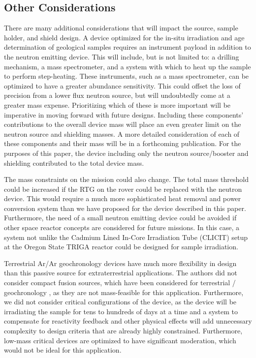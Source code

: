 \documentclass{mc2015}
\begin{document}
\subsection{Other Considerations}
\label{sec:others}

There are many additional considerations that will impact the source, sample holder, and shield design. A device optimized for the in-situ irradiation and age determination of geological samples requires an instrument payload in addition to the neutron emitting device. This will include, but is not limited to: a drilling mechanism, a mass spectrometer, and a system with which to heat up the sample to perform step-heating. These instruments, such as a mass spectrometer, can be optimized to have a greater abundance sensitivity. This could offset the loss of precision from a lower flux neutron source, but will undoubtedly come at a greater mass expense. Prioritizing which of these is more important will be imperative in moving forward with future designs. Including these components' contributions to the overall device mass will place an even greater limit on the neutron source and shielding masses. A more detailed consideration of each of these components and their mass will be in a forthcoming publication. For the purposes of this paper, the device including only the neutron source/booster and shielding contributed to the total device mass. 

The mass constraints on the mission could also change. The total mass threshold could be increased if the RTG on the rover could be replaced with the neutron device. This would require a much more sophisticated heat removal and power conversion system than we have proposed for the device described in this paper. Furthermore, the need of a small neutron emitting device could be avoided if other space reactor concepts are considered for future missions. In this case, a system not unlike the Cadmium Lined In-Core Irradiation Tube (CLICIT) setup at the Oregon State TRIGA reactor \cite{OSTRCLICIT} could be designed for sample irradiation.

Terrestrial Ar/Ar geochronology devices have much more flexibility in design than this passive source for extraterrestrial applications. The authors did not consider compact fusion sources, which have been considered for terrestrial / geochronology \cite{renne_application_2005}, as they are not mass-feasible for this application. Furthermore, we did not consider critical configurations of the device, as the device will be irradiating the sample for tens to hundreds of days at a time and a system to compensate for reactivity feedback and other physical effects will add unnecessary complexity to  design criteria that are already highly constrained. Furthermore, low-mass critical devices are optimized to have significant moderation, which would not be ideal for this application. 
\end{document}
